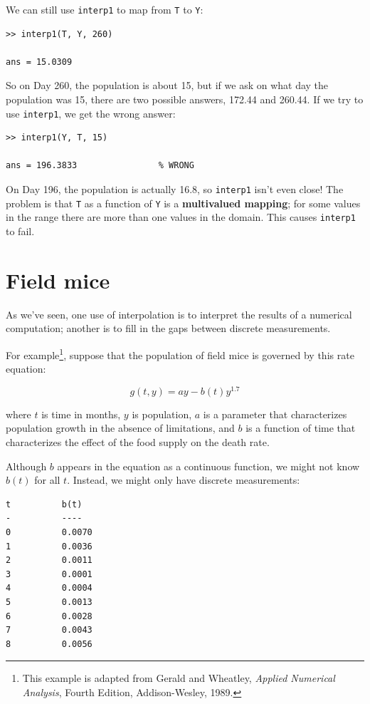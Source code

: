 \documentclass{book}
\begin{document}
We can still use {\tt interp1} to map from {\tt T} to {\tt Y}:

\begin{verbatim}
>> interp1(T, Y, 260)

ans = 15.0309
\end{verbatim}

So on Day 260, the population is about 15, but if we ask on what
day the population was 15, there are two possible answers, 172.44
and 260.44.  If we try to use {\tt interp1}, we get the wrong answer:

\begin{verbatim}
>> interp1(Y, T, 15)         

ans = 196.3833                % WRONG
\end{verbatim}

On Day 196, the population is actually 16.8, so {\tt interp1} isn't
even close!  The problem is that {\tt T} as a function of {\tt Y} is a
{\bf multivalued mapping}; for some values in the range there are more
than one values in the domain.  This causes {\tt interp1} to fail.  


\section{Field mice}

As we've seen, one use of interpolation is to interpret the results
of a numerical computation; another is to fill in the gaps between
discrete measurements.

For example\footnote{This example is adapted from Gerald and Wheatley,
{\em Applied Numerical Analysis}, Fourth Edition, Addison-Wesley,
1989.}, suppose that the population of field mice is governed by this
rate equation:

\[ g(t, y) = ay - b(t) y^{1.7} \]

where $t$ is time in months, $y$ is population, $a$ is a parameter
that characterizes population growth in the absence of limitations,
and $b$ is a function of time that characterizes the effect of the
food supply on the death rate.

Although $b$ appears in the equation as a continuous function, we
might not know $b(t)$ for all $t$.  Instead, we might only have discrete
measurements:

\begin{verbatim}
t          b(t)
-          ----
0          0.0070
1          0.0036             
2          0.0011
3          0.0001
4          0.0004
5          0.0013
6          0.0028
7          0.0043
8          0.0056
\end{verbatim}
\end{document}
